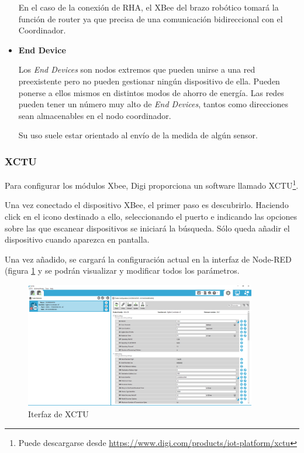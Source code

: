 \begin{itemize}
En el caso de la conexión de RHA, el XBee del brazo robótico tomará la función de router ya que precisa de una comunicación bidireccional con el Coordinador.

\item \textbf{End Device}

Los \textit{End Devices} son nodos extremos que pueden unirse a una red preexistente pero no pueden gestionar ningún dispositivo de ella. Pueden ponerse a ellos mismos en distintos modos de ahorro de energía. Las redes pueden tener un número muy alto de \textit{End Devices}, tantos como direcciones sean almacenables en el nodo coordinador.

Su uso suele estar orientado al envío de la medida de algún sensor.

\end{itemize}

\subsubsection{XCTU}\label{subsubsec:xctu}

Para configurar los módulos Xbee, Digi proporciona un software llamado XCTU\footnote{Puede descargarse desde \url{https://www.digi.com/products/iot-platform/xctu}}. 

Una vez conectado el dispositivo XBee, el primer paso es descubrirlo. Haciendo click en el icono destinado a ello, seleccionando el puerto e indicando las opciones sobre las que escanear dispositivos se iniciará la búsqueda. Sólo queda añadir el dispositivo cuando aparezca en pantalla.

Una vez añadido, se cargará la configuración actual en la interfaz de Node-RED (figura \ref{fig:XCTU} y  se podrán visualizar y modificar todos los parámetros.

\begin{figure}[tb]
\centering
\includegraphics[width=0.9\textwidth, frame]{figuras/interfazXCTU.png}
\caption{Iterfaz de XCTU}
\label{fig:XCTU}
\end{figure}

